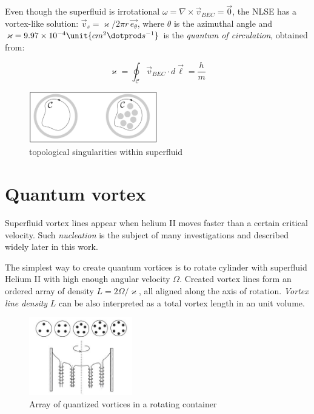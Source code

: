 Even though the superfluid is irrotational $\omega = \nabla \times \vec{v}_{BEC} = \vec{0}$, the NLSE has a vortex-like solution: $\vec{v}_s = \varkappa / 2\pi r\, \vec{e_{\theta}}$, where $\theta$ is the azimuthal angle and $\varkappa=9.97 \times 10^{-4} \unit{cm^2 \dotprod s^{-1}}$ is the \textit{quantum of circulation}, obtained from:

\begin{equation}
\varkappa = \oint_{\mathcal{C}} \vec{v}_{BEC} \cdot \unit{d}\vec{\boldsymbol{\ell}} = \frac{h}{m}
\label{varkappa}
\end{equation}

\begin{figure}[h]
	\centering
	\includegraphics[width=0.5\textwidth]{graphics/theory/singularity}
	\caption{topological singularities within superfluid}
	\label{singularity}
\end{figure}


\section{Quantum vortex}

Superfluid vortex lines appear when helium II moves faster than a certain critical velocity. Such \textit{nucleation} is the subject of many investigations and described widely later in this work.

The simplest way to create quantum vortices is to rotate cylinder with superfluid Helium II with high enough angular velocity $\Omega$. Created vortex lines form an ordered array of density $L=2\Omega / \varkappa$, all aligned along the axis of rotation. \textit{Vortex line density} $L$ can be also interpreted as a total vortex length in an unit volume.

\begin{figure}[h]
	\centering
	\includegraphics[width=0.4\textwidth]{graphics/theory/rotating-helium}
	\caption{Array of quantized vortices in a rotating container}
	\label{rotating-helium}
\end{figure}

